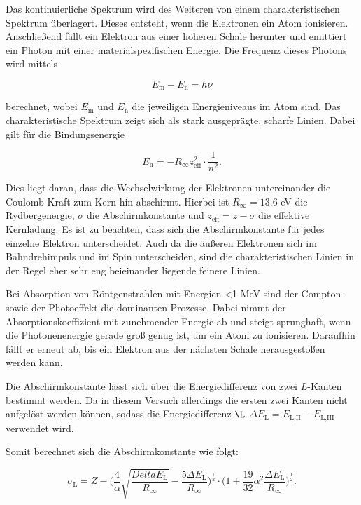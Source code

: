 Das kontinuierliche Spektrum wird des Weiteren von einem charakteristischen Spektrum überlagert.
Dieses entsteht, wenn die Elektronen ein Atom ionisieren. Anschließend fällt ein Elektron aus einer höheren Schale herunter und emittiert ein Photon mit einer materialspezifischen Energie.
Die Frequenz dieses Photons wird mittels

\begin{equation}
    \label{eqn:schalen}
    E_\text{m} - E_\text{n} = h \nu
\end{equation}

berechnet, wobei $E_\text{m}$ und $E_\text{n}$ die jeweiligen Energieniveaus im Atom sind.
Das charakteristische Spektrum zeigt sich als stark ausgeprägte, scharfe Linien.
Dabei gilt für die Bindungsenergie

\begin{equation}
    \label{eqn:Bindungsenergie}
    E_\text{n} = -R_\infty z_\text{eff}^2 \cdot \frac{1}{n^2}.
\end{equation}

Dies liegt daran, dass die Wechselwirkung der Elektronen untereinander die Coulomb-Kraft zum Kern hin abschirmt.
Hierbei ist $R_\infty = 13.6$ eV die Rydbergenergie, $\sigma$ die Abschirmkonstante und $z_\text{eff} = z - \sigma$ die effektive Kernladung.
Es ist zu beachten, dass sich die Abschirmkonstante für jedes einzelne Elektron unterscheidet.
Auch da die äußeren Elektronen sich im Bahndrehimpuls und im Spin unterscheiden, sind die charakteristischen Linien in der Regel eher sehr eng beieinander liegende feinere Linien.

Bei Absorption von Röntgenstrahlen mit Energien <1 MeV sind der Compton- sowie der Photoeffekt die dominanten Prozesse.
Dabei nimmt der Absorptionskoeffizient mit zunehmender Energie ab und steigt sprunghaft, wenn die Photonenenergie gerade groß genug ist, um ein Atom zu ionisieren.
Daraufhin fällt er erneut ab, bis ein Elektron aus der nächsten Schale herausgestoßen werden kann.

Die Abschirmkonstante lässt sich über die Energiedifferenz von zwei $L$-Kanten bestimmt werden. Da in diesem Versuch allerdings die ersten zwei Kanten nicht aufgelöst werden können, sodass die Energiedifferenz $\L$ $\Delta E_\text{L} = E_\text{L,II} - E_\text{L,III}$ verwendet wird.

Somit berechnet sich die Abschirmkonstante wie folgt:

\begin{equation}
    \label{eqn:abschirm}
    \sigma_\text{L} = Z - \bigg( \frac{4}{\alpha} \sqrt{\frac{Delta E_\text{L}}{R_\infty }} - \frac{5 \Delta E_\text{L}}{R_\infty} \bigg)^\frac{1}{2} \cdot \bigg( 1 + \frac{19}{32} \alpha^2 \frac{\Delta E_\text{L}}{R_\infty} \bigg)^\frac{1}{2}.
\end{equation}


